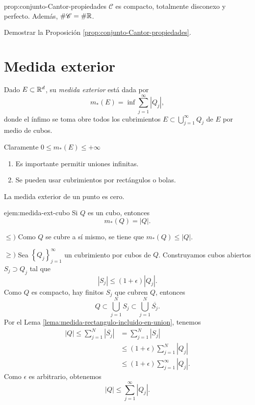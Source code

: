  \begin{proposicion}{prop:conjunto-Cantor-propiedades}
 $\mathscr{C}$ es compacto, totalmente disconexo y perfecto. 
 Adem\'as, $\# \mathscr{C}=\# \mathbb{R}$.
 \end{proposicion}
 
 \begin{ejercicio}{}
 Demostrar la Proposici\'on \ref{prop:conjunto-Cantor-propiedades}.
 \end{ejercicio}
 
 \section{Medida exterior}
 
 \begin{definicion}{}
 Dado $E\subset \mathbb{R}^d$, su \emph{medida exterior} est\'a dada por 
 \[
 m_*(E)=\inf \sum\limits_{j=1}^{\infty} |Q_j|,
 \]
 donde el \'infimo se toma obre todos los cubrimientos  $E\subset \bigcup\limits_{j=1}^{\infty} Q_j$ de $E$ por medio de cubos.
 \end{definicion}
 
 Claramente $0\leq m_{*}(E)\leq +\infty$
 
 \begin{observacion}{}
 \begin{enumerate}
    \item  Es importante permitir uniones infinitas.
     \item Se pueden usar cubrimientos por rect\'angulos o bolas.
 \end{enumerate}
  \end{observacion}
  
  \begin{ejemplo}{}
  La medida exterior de un punto es cero.
  \end{ejemplo}
  
  \begin{ejemplo}{ejem:medida-ext-cubo}
  Si $Q$ es un cubo, entonces \[m_{*}(Q)=|Q|.\] 
  
  $\leq)$
  Como $Q$ se cubre a s\'i mismo, se tiene que $m_{*}(Q)\leq |Q|$.
  
  $\geq)$ 
  Sea $\left\{Q_j\right\}_{j=1}^{\infty}$ un cubrimiento por cubos de $Q$. Construyamos cubos abiertos $S_j \supset Q_j$ tal que 
  \[
  |S_j|\leq (1+\epsilon) |Q_j|.
  \]
  Como $Q$ es compacto, hay finitos $S_j$ que cubren $Q$, entonces
  \[
  Q\subset \bigcup\limits_{j=1}^N S_j \subset 
  \bigcup\limits_{j=1}^N \overline{S_j}.
  \]
  Por el Lema \ref{lema:medida-rectangulo-incluido-en-union}, tenemos
  \[
  \begin{split}
  |Q|\leq 
  \sum\limits_{j=1}^N |\overline{S_j}|&=
  \sum\limits_{j=1}^N |S_j|
  \\
  &\leq (1+\epsilon) \sum\limits_{j=1}^N |Q_j|\\
  &\leq   (1+\epsilon) \sum\limits_{j=1}^{\infty} |Q_j|.
  \end{split}
  \]
  Como $\epsilon$ es arbitrario, obtenemos
  \[
  |Q|\leq \sum\limits_{j=1}^{\infty} |Q_j|.
  \]
  \end{ejemplo}
  
